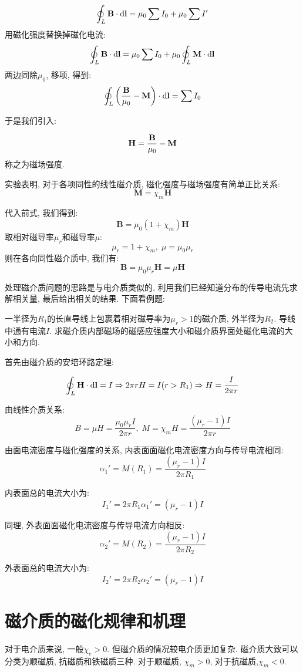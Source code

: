 \[
\oint_L \mathbf{B} \cdot \mathop{}\!\mathrm{d} \mathbf{l} = \mu_0\sum I_0+\mu_0\sum I'
\]
用磁化强度替换掉磁化电流:
\[
\oint_L \mathbf{B} \cdot \mathop{}\!\mathrm{d} \mathbf{l} = \mu_0\sum I_0+\mu_0 \oint_L \mathbf M \cdot \mathop{}\!\mathrm{d} \mathbf{l}
\]
两边同除$\mu_0$, 移项, 得到:
\[
\oint_L \left(\frac{\mathbf{B}}{\mu_0}-\mathbf{M}\right)\cdot\mathop{}\!\mathrm{d}\mathbf{l}=\sum I_0
\]

于是我们引入:
\begin{definition}[磁场强度]


\[
\mathbf{H} = \frac{\mathbf{B}}{\mu_0}-\mathbf{M}
\]
称之为磁场强度.
\end{definition}
实验表明, 对于各项同性的线性磁介质, 磁化强度与磁场强度有简单正比关系:
\[
\mathbf{M} = \chi_m \mathbf{H}
\]

代入前式, 我们得到:
\[
\mathbf{B} = \mu_0(1+\chi_m)\mathbf{H}
\]
取相对磁导率$\mu_r$和磁导率$\mu$:
\[
\mu_r = 1+\chi_m,\; \mu = \mu_0 \mu_r
\]
则在各向同性磁介质中, 我们有:
\[
\mathbf{B} = \mu_0\mu_r \mathbf{H} = \mu \mathbf{H}
\]

处理磁介质问题的思路是与电介质类似的, 利用我们已经知道分布的传导电流先求解相关量, 最后给出相关的结果. 下面看例题:
\begin{example}

一半径为$R_1$的长直导线上包裹着相对磁导率为$\mu_r>1$的磁介质, 外半径为$R_2$. 导线中通有电流$I$. 求磁介质内部磁场的磁感应强度大小和磁介质界面处磁化电流的大小和方向.

首先由磁介质的安培环路定理:

\[
\oint_L \mathbf{H}\cdot \mathop{}\!\mathrm{d} \mathbf{l} = I \Rightarrow 2\pi r H = I (r>R_1) \Rightarrow H = \frac{I}{2\pi r}
\]

由线性介质关系:
\[
B = \mu H = \frac{\mu_0\mu_r I}{2\pi r}, \; M = \chi_m H =\frac{(\mu_r-1) I}{2\pi r}
\]

由面电流密度与磁化强度的关系, 内表面面磁化电流密度方向与传导电流相同:
\[
\alpha_1' = M(R_1) = \frac{(\mu_r-1) I}{2\pi R_1}
\]

内表面总的电流大小为:
\[
I_1' = 2\pi R_1\alpha_1' = (\mu_r-1) I
\]

同理, 外表面面磁化电流密度与传导电流方向相反:
\[
\alpha_2' = M(R_2) = \frac{(\mu_r-1) I}{2\pi R_2}
\]

外表面总的电流大小为:
\[
I_2' = 2\pi R_2\alpha_2' = (\mu_r-1) I
\]
\end{example}


\section{磁介质的磁化规律和机理}
对于电介质来说, 一般$\chi_e>0$. 但磁介质的情况较电介质更加复杂. 磁介质大致可以分类为顺磁质, 抗磁质和铁磁质三种. 对于顺磁质, $\chi_m>0$, 对于抗磁质,$\chi_m<0$.


